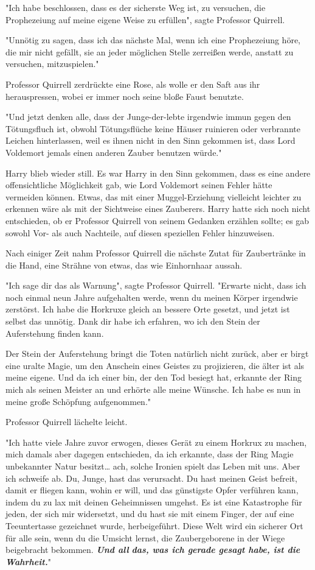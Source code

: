 {"Ich habe beschlossen, dass es der sicherste Weg ist, zu versuchen, die Prophezeiung auf meine eigene Weise zu erfüllen", sagte Professor Quirrell.

"Unnötig zu sagen, dass ich das nächste Mal, wenn ich eine Prophezeiung höre, die mir nicht gefällt, sie an jeder möglichen Stelle zerreißen werde, anstatt zu versuchen, mitzuspielen."

Professor Quirrell zerdrückte eine Rose, als wolle er den Saft aus ihr herauspressen, wobei er immer noch seine bloße Faust benutzte.

"Und jetzt denken alle, dass der Junge-der-lebte irgendwie immun gegen den Tötungsfluch ist, obwohl Tötungsflüche keine Häuser ruinieren oder verbrannte Leichen hinterlassen, weil es ihnen nicht in den Sinn gekommen ist, dass Lord Voldemort jemals einen anderen Zauber benutzen würde."

Harry blieb wieder still. Es war Harry in den Sinn gekommen, dass es eine andere offensichtliche Möglichkeit gab, wie Lord Voldemort seinen Fehler hätte vermeiden können. Etwas, das mit einer Muggel-Erziehung vielleicht leichter zu erkennen wäre als mit der Sichtweise eines Zauberers. Harry hatte sich noch nicht entschieden, ob er Professor Quirrell von seinem Gedanken erzählen sollte; es gab sowohl Vor- als auch Nachteile, auf diesen speziellen Fehler hinzuweisen.

Nach einiger Zeit nahm Professor Quirrell die nächste Zutat für Zaubertränke in die Hand, eine Strähne von etwas, das wie Einhornhaar aussah.

"Ich sage dir das als Warnung", sagte Professor Quirrell. "Erwarte nicht, dass ich noch einmal neun Jahre aufgehalten werde, wenn du meinen Körper irgendwie zerstörst. Ich habe die Horkruxe gleich an bessere Orte gesetzt, und jetzt ist selbst das unnötig. Dank dir habe ich erfahren, wo ich den Stein der Auferstehung finden kann.

Der Stein der Auferstehung bringt die Toten natürlich nicht zurück, aber er birgt eine uralte Magie, um den Anschein eines Geistes zu projizieren, die älter ist als meine eigene. Und da ich einer bin, der den Tod besiegt hat, erkannte der Ring mich als seinen Meister an und erhörte alle meine Wünsche. Ich habe es nun in meine große Schöpfung aufgenommen."

Professor Quirrell lächelte leicht.

"Ich hatte viele Jahre zuvor erwogen, dieses Gerät zu einem Horkrux zu machen, mich damals aber dagegen entschieden, da ich erkannte, dass der Ring Magie unbekannter Natur besitzt… ach, solche Ironien spielt das Leben mit uns. Aber ich schweife ab. Du, Junge, hast das verursacht. Du hast meinen Geist befreit, damit er fliegen kann, wohin er will, und das günstigste Opfer verführen kann, indem du zu lax mit deinen Geheimnissen umgehst. Es ist eine Katastrophe für jeden, der sich mir widersetzt, und du hast sie mit einem Finger, der auf eine Teeuntertasse gezeichnet wurde, herbeigeführt. Diese Welt wird ein sicherer Ort für alle sein, wenn du die Umsicht lernst, die Zaubergeborene in der Wiege beigebracht bekommen. \textbf{\emph{Und all}} \textbf{\emph{das, was ich gerade gesagt habe, ist die Wahrheit.}}"

}
